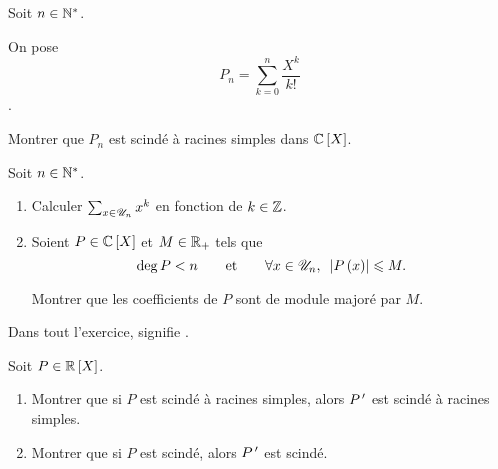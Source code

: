\begin{corr}
\end{corr}

\begin{exo}[Exercice 14]
Soit \(n\in\mathbb{N}^*\).

On pose \[P_n=\sum_{k=0}^n\dfrac{X^k}{k!}\].

Montrer que \(P_n\) est scindé à racines simples dans \(\poly[\C]\).
\end{exo}

\begin{corr}
\end{corr}

\begin{exo}[Exercice 15]
Soit \(n\in\mathbb{N}^*\).

\begin{enumerate}
\item Calculer \(\sum_{x\in\mathscr{U}_n}x^k\) en fonction de \(k\in\mathbb{Z}\). \\

\item Soient \(P\in\poly[\C]\) et \(M\in\mathbb{R}_+\) tels que \[\deg P<n\qquad\text{et}\qquad\quantifs{\forall x\in\U_n}\abs{P\paren{x}}\leq M.\]

Montrer que les coefficients de \(P\) sont de module majoré par \(M\).
\end{enumerate}
\end{exo}

\begin{corr}
\end{corr}

\begin{exo}
Dans tout l'exercice,  signifie .

Soit \(P\in\poly[\R]\).

\begin{enumerate}
\item Montrer que si \(P\) est scindé à racines simples, alors \(P^{\,\prime}\) est scindé à racines simples. \\

\item Montrer que si \(P\) est scindé, alors \(P^{\,\prime}\) est scindé.
\end{enumerate}
\end{exo}

\begin{corr}
\end{corr}

